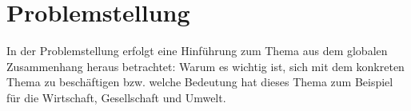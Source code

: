 

\section{Problemstellung}\label{cha:problem}
In der Problemstellung erfolgt eine Hinführung zum Thema aus dem globalen Zusammenhang heraus betrachtet: 
Warum es wichtig ist, sich mit dem konkreten Thema zu beschäftigen bzw. welche Bedeutung hat dieses Thema zum Beispiel für die Wirtschaft, Gesellschaft und Umwelt.
